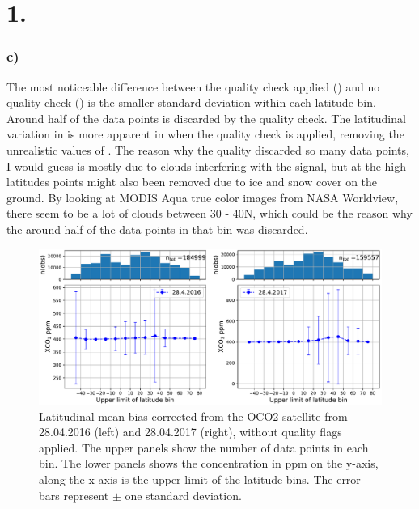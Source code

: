 \section*{1.}

\subsubsection*{c)}

The most noticeable difference between the quality check applied
() and no quality check ()
is the smaller standard deviation within each latitude bin. Around half of the
data points is discarded by the quality check. The latitudinal variation in
 is more apparent in when the quality check is applied, removing the
unrealistic values of . The reason why the quality discarded so many
data points, I would guess is mostly due to clouds interfering with the signal,
but at the high latitudes points might also been removed due to ice and snow
cover on the ground. By looking at MODIS Aqua true color images from NASA
Worldview, there seem to be a lot of clouds between 30 - 40\degree N, which
could be the reason why the around half of the data points in that bin was
discarded.   
\begin{figure}[htbp]
    \includegraphics[width=\textwidth]{../xCO2.pdf}
    \centering
    \caption{Latitudinal mean  bias corrected  from the OCO2 satellite from 28.04.2016 (left) 
    and 28.04.2017 (right), without quality flags applied. The upper panels 
    show the number of data points in each bin. The lower panels shows the  
    concentration in ppm on the y-axis, along the x-axis is the upper limit of
    the latitude bins. The error bars represent $\pm$ one standard deviation.}
    \label{fig:no_qa_xco2}

\end{figure}

